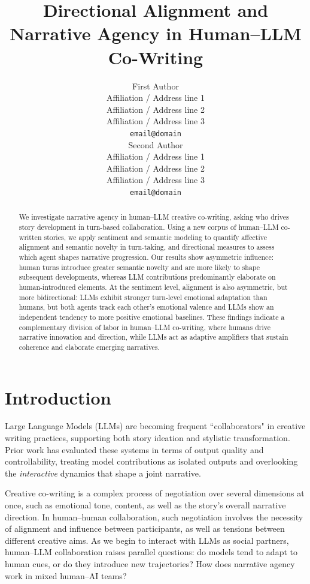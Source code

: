 \documentclass[11pt]{article}
\title{Directional Alignment and Narrative Agency in Human–LLM Co-Writing}
\author{First Author \\
  Affiliation / Address line 1 \\
  Affiliation / Address line 2 \\
  Affiliation / Address line 3 \\
  \texttt{email@domain} \\\And
  Second Author \\
  Affiliation / Address line 1 \\
  Affiliation / Address line 2 \\
  Affiliation / Address line 3 \\
  \texttt{email@domain} \\}
\begin{document}
\maketitle
\begin{abstract}
We investigate narrative agency in human–LLM creative co-writing, asking who drives story development in turn-based collaboration. Using a new corpus of human–LLM co-written stories, we apply sentiment and semantic modeling to quantify affective alignment and semantic novelty in turn-taking, and directional measures to assess which agent shapes narrative progression.
Our results show asymmetric influence: human turns introduce greater semantic novelty and are more likely to shape subsequent developments, whereas LLM contributions predominantly elaborate on human-introduced elements. At the sentiment level, alignment is also asymmetric, but more bidirectional: LLMs exhibit stronger turn-level emotional adaptation than humans, but both agents track each other's emotional valence and LLMs show an independent tendency to more positive emotional baselines. 
These findings indicate a complementary division of labor in human–LLM co-writing, where humans drive narrative innovation and direction, while LLMs act as adaptive amplifiers that sustain coherence and elaborate emerging narratives.


\end{abstract}

\section{Introduction}

Large Language Models (LLMs) are becoming frequent ``collaborators" in creative writing practices, supporting both story ideation and stylistic transformation. Prior work has evaluated these systems in terms of output quality and controllability, treating model contributions as isolated outputs and overlooking the \textit{interactive} dynamics that shape a joint narrative.

Creative co-writing is a complex process of negotiation over several dimensions at once, such as emotional tone, content, as well as the story's overall narrative direction. In human--human collaboration, such negotiation involves the necessity of alignment and influence between participants, as well as tensions between different creative aims. As we begin to interact with LLMs as social partners, human--LLM collaboration raises parallel questions: do models tend to adapt to human cues, or do they introduce new trajectories? How does narrative agency work in mixed human--AI teams?
\end{document}
